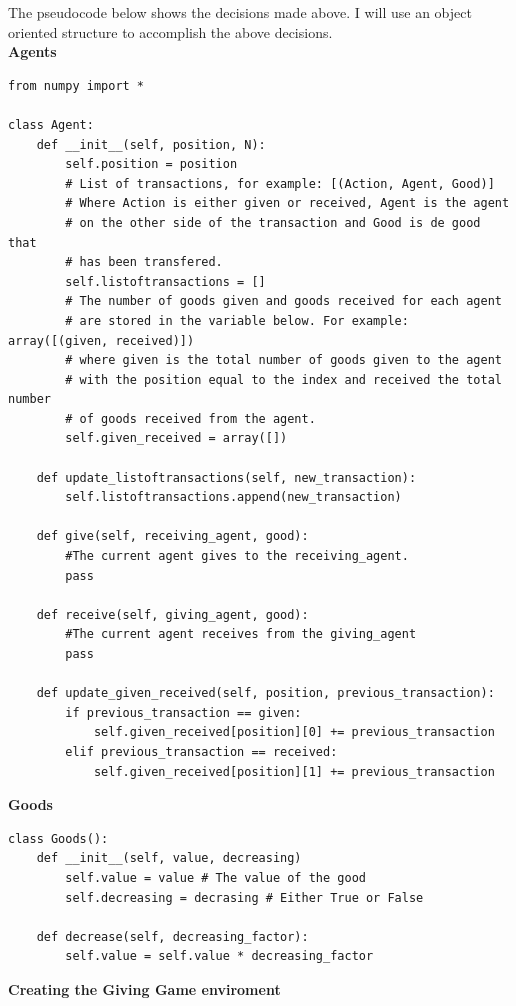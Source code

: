 \documentclass{article}
\begin{document}
The pseudocode below shows the decisions made above. I will use an object oriented structure to accomplish the above decisions.
\\
\textbf{Agents}
\begin{lstlisting}
from numpy import *

class Agent:
	def __init__(self, position, N):
		self.position = position
		# List of transactions, for example: [(Action, Agent, Good)] 
		# Where Action is either given or received, Agent is the agent 
		# on the other side of the transaction and Good is de good that
		# has been transfered.
		self.listoftransactions = []
		# The number of goods given and goods received for each agent
		# are stored in the variable below. For example: array([(given, received)])
		# where given is the total number of goods given to the agent 
		# with the position equal to the index and received the total number
		# of goods received from the agent.
		self.given_received = array([])
	
	def update_listoftransactions(self, new_transaction):
		self.listoftransactions.append(new_transaction)

	def give(self, receiving_agent, good):
		#The current agent gives to the receiving_agent.
		pass
	
	def receive(self, giving_agent, good):
		#The current agent receives from the giving_agent
		pass
	
	def update_given_received(self, position, previous_transaction):
		if previous_transaction == given:
			self.given_received[position][0] += previous_transaction
		elif previous_transaction == received:
			self.given_received[position][1] += previous_transaction

\end{lstlisting}
\textbf{Goods}
\begin{lstlisting}
class Goods():
	def __init__(self, value, decreasing)
		self.value = value # The value of the good
		self.decreasing = decrasing # Either True or False

	def decrease(self, decreasing_factor):
		self.value = self.value * decreasing_factor
\end{lstlisting}
\clearpage
\textbf{Creating the Giving Game enviroment}
\end{document}
